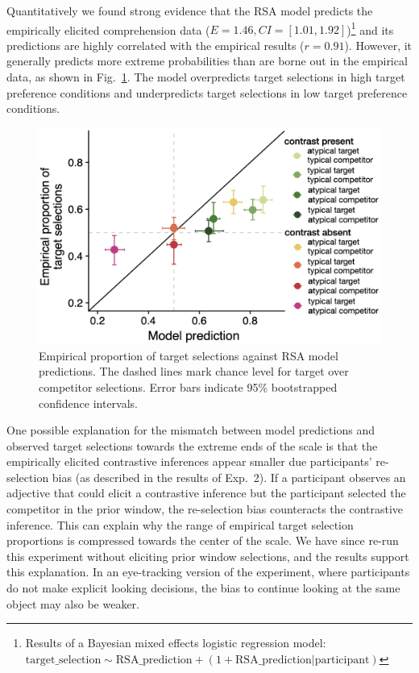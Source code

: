 \documentclass[10pt,letterpaper]{article}
\newcommand{\figref}[1]{Fig.~\ref{#1}}
\begin{document}
Quantitatively we found strong evidence that the RSA model predicts the empirically elicited comprehension data ($E=1.46, CI=[1.01, 1.92]$)\footnote{Results of a Bayesian mixed effects logistic regression model: $\text{target\_selection} \sim \text{RSA\_prediction} + (1+\text{RSA\_prediction}|\text{participant})$} and its predictions are highly correlated with the empirical results ($r=0.91$). However, it generally predicts more extreme probabilities than are borne out in the empirical data, as shown in \figref{model-results-corr-flatprior}. The model overpredicts target selections in high target preference conditions and underpredicts target selections in low target preference conditions. 

\begin{figure}
	\begin{center}
		\includegraphics[width=.475\textwidth]{graphs/corr-plot.pdf}
	\end{center}
\caption{Empirical proportion of target selections against RSA model predictions. The dashed lines mark chance level for target over competitor selections. Error bars indicate 95\% bootstrapped confidence intervals.} 
\label{model-results-corr-flatprior}
\end{figure}

One possible explanation for the mismatch between model predictions and observed target selections towards the extreme ends of the scale is that the empirically elicited contrastive inferences appear smaller due participants' re-selection bias (as described in the results of Exp.~2). If a participant observes an adjective that could elicit a contrastive inference but the participant selected the competitor in the prior window, the re-selection bias counteracts the contrastive inference. This can explain why the range of empirical target selection proportions is compressed towards the center of the scale. We have since re-run this experiment without eliciting prior window selections, and the results support this explanation. In an eye-tracking version of the experiment, where participants do not make explicit looking decisions, the bias to continue looking at the same object may also be weaker.
\end{document}
